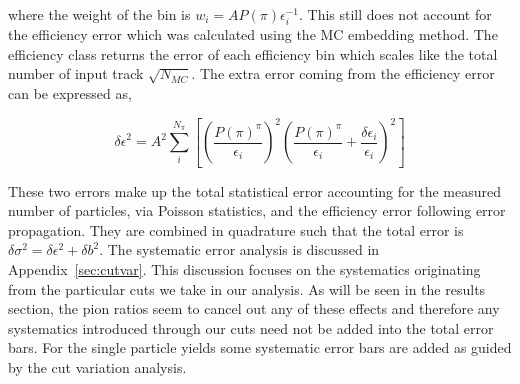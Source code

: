 where the weight of the bin is $w_i = A P(\pi) \epsilon_i^{-1}$. This still does not account for the efficiency error which was calculated using the MC embedding method. The efficiency class returns the error of each efficiency bin which scales like the total number of input track $\sqrt{N_{MC}}$. The extra error coming from the efficiency error can be expressed as,

\begin{equation}
{\delta \epsilon }^2 = A^2 \sum_i^{N_{\pi}} \left[ \left( \frac{P(\pi)^{\pi} }{\epsilon_i} \right)^2  \left(  \frac{P(\pi)^{\pi} }{\epsilon_i} + \frac{\delta \epsilon_i}{\epsilon_i} \right)^2   \right]
\end{equation}

These two errors make up the total statistical error accounting for the measured number of particles, via Poisson statistics, and the efficiency error following error propagation. They are combined in quadrature such that the total error is $\delta \sigma^2 = \delta\epsilon^2 + \delta b^2$. The systematic error analysis is discussed in Appendix~\ref{sec:cutvar}. This discussion focuses on the systematics originating from the particular cuts we take in our analysis. As will be seen in the results section, the pion ratios seem to cancel out any of these effects and therefore any systematics introduced through our cuts need not be added into the total error bars. For the single particle yields some systematic error bars are added as guided by the cut variation analysis. 
